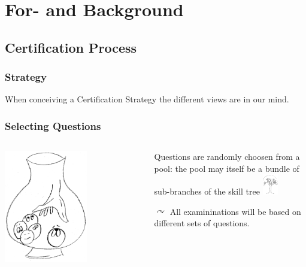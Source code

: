 \section[For- and Background]{For- and Background}



\subsection{Certification Process}

\begin{frame}
  \frametitle{Strategy}
  When conceiving a Certification Strategy the different views are in our mind.
  
\end{frame}

\begin{frame}
 \frametitle{Selecting Questions}
 \begin{columns}
    \begin{column}{.5\textwidth}
       \centering
      \includegraphics[width=0.6\textwidth]{images/urn}
    \end{column}
    \begin{column}{.5\textwidth}
      Questions are randomly choosen from a pool:
         the pool may itself be a bundle of sub-branches of the skill tree
              \includegraphics[width=0.1\textwidth]{images/tree_tiny}
        
      $\curvearrowright$ All examininations will be based on different sets of questions.
    \end{column}
  \end{columns}
\end{frame}

